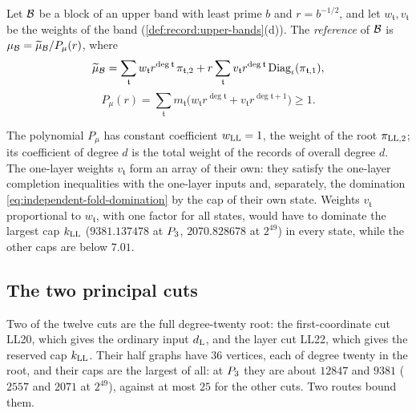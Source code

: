 \begin{definition}\label{def:upper-reference}
Let $\mathcal B$ be a block of an upper band with least prime $b$ and $r=b^{-1/2}$, and
let $w_{\mathfrak t},v_{\mathfrak t}$ be the weights of the band
(\cref{def:record:upper-bands}(d)). The \emph{reference} of $\mathcal B$ is
$\mu_\mathcal B=\widetilde\mu_\mathcal B/P_\mu(r)$, where
\[
 \widetilde\mu_\mathcal B=\sum_{\mathfrak t}w_{\mathfrak t}r^{\deg\mathfrak t}\,\pi_{\mathfrak t,2}
 +r\sum_{\mathfrak t}v_{\mathfrak t}r^{\deg\mathfrak t}\operatorname{Diag}_\iota(\pi_{\mathfrak t,1}),
\]
\begin{equation}\label{eq:independent-fold-polynomial}
 P_\mu(r)=\sum_{\mathfrak t}m_{\mathfrak t}\bigl(w_{\mathfrak t}r^{\deg\mathfrak t}
 +v_{\mathfrak t}r^{\deg\mathfrak t+1}\bigr)\ge1 .
\end{equation}
\end{definition}

The polynomial $P_\mu$ has constant coefficient $w_{\rm LL}=1$, the weight of the
root $\pi_{\rm LL,2}$; its coefficient of degree $d$ is the total weight of the
records of overall degree $d$. The one-layer weights $v_{\mathfrak t}$ form an
array of their own: they satisfy the one-layer completion inequalities with the
one-layer inputs and, separately, the domination
\eqref{eq:independent-fold-domination} by the cap of their own state. Weights
$v_{\mathfrak t}$ proportional to $w_{\mathfrak t}$, with one factor for all states,
would have to dominate the largest cap $k_{\rm LL}$ ($9381.137478$ at $P_3$,
$2070.828678$ at $2^{49}$) in every state, while the other caps are below $7.01$.

\subsection{The two principal cuts}\label{subsec:record:upper_root}

Two of the twelve cuts are the full degree-twenty root: the first-coordinate cut
LL20, which gives the ordinary input $d_{\rm L}$, and the layer cut LL22, which
gives the reserved cap $k_{\rm LL}$. Their half graphs have $36$ vertices, each of
degree twenty in the root, and their caps are the largest of all: at $P_3$
they are about $12847$ and $9381$ ($2557$ and $2071$ at $2^{49}$), against at most
$25$ for the other cuts. Two routes bound them.

